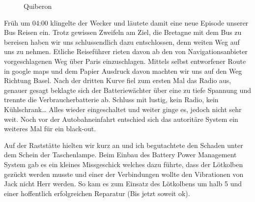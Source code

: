 \begin{figure}[b]
   \centering
   \quad
   \quad
   \quad
   \caption[Quiberon]{Quiberon}
\end{figure}

Früh um 04:00 klingelte der Wecker und läutete damit eine neue Episode unserer Bus Reisen ein.
Trotz gewissen Zweifeln am Ziel, die Bretagne mit dem Bus zu bereisen haben wir uns schlussendlich dazu entschlossen, denn weiten Weg auf uns zu nehmen.
Etliche Reiseführer rieten davon ab den von Navigationsanbieter vorgeschlagenen Weg über Paris einzuschlagen.
Mittels selbst entworfener Route in google maps und dem Papier Ausdruck davon machten wir uns auf den Weg Richtung Basel.
Nach der dritten Kurve fiel zum ersten Mal das Radio aus, genauer gesagt beklagte sich der Batteriewächter über eine zu tiefe Spannung und trennte die Verbraucherbatterie ab.
Schluss mit lustig, kein Radio, kein Kühlschrank\dots{}
Alles wieder eingeschaltet und weiter ginge es, jedoch nicht sehr weit.
Noch vor der Autobahneinfahrt entschied sich das autoritäre System ein weiteres Mal für ein black-out.

Auf der Raststätte hielten wir kurz an und ich begutachtete den \glqq Schaden\grqq{} unter dem Schein der Taschenlampe.
Beim Einbau des \glqq Battery Power Management System\grqq{} gab es ein kleines Missgeschick welches dazu führte, dass der Lötkolben gezückt werden musste und einer der Verbindungen wollte den Vibrationen von Jack nicht Herr werden.
So kam es zum Einsatz des Lötkolbens um halb 5 und einer hoffentlich erfolgreichen Reparatur (Bis jetzt soweit ok).

